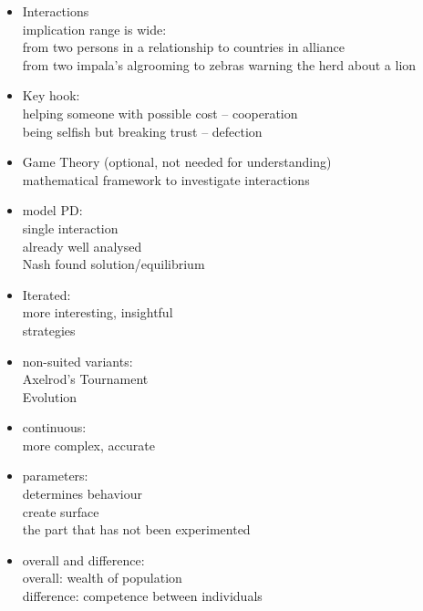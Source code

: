 \documentclass[11pt]{article}
\begin{document}
\begin{itemize}


	\item Interactions\\
		implication range is wide:\\
		from two persons in a relationship to countries in alliance\\
		from two impala's algrooming to zebras warning the herd about a lion \\

	\item Key hook:\\
		helping someone with possible cost -- cooperation\\
		being selfish but breaking trust -- defection\\

	\item Game Theory (optional, not needed for understanding)\\
		mathematical framework to investigate interactions\\

	\item model PD:\\
		single interaction\\
		already well analysed\\
		Nash found solution/equilibrium\\

	\item Iterated:\\
		more interesting, insightful\\
		strategies\\

	\item non-suited variants:\\
		Axelrod's Tournament\\
		Evolution\\

	\item continuous:\\
		more complex, accurate\\

	\item parameters:\\
		determines behaviour\\
		create surface\\
		the part that has not been experimented\\

	\item overall and difference:\\
		overall: wealth of population\\
		difference: competence between individuals\\

\end{itemize}
\end{document}

